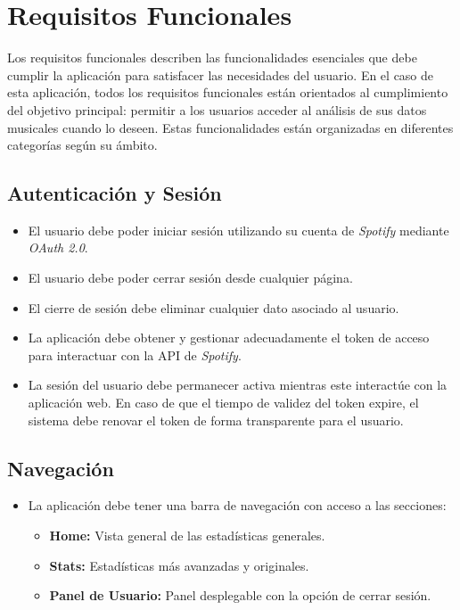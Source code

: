 \section{Requisitos Funcionales}

Los requisitos funcionales describen las funcionalidades esenciales que debe cumplir la aplicación para satisfacer las necesidades del usuario. En el caso de esta aplicación, todos los requisitos funcionales están orientados al cumplimiento del objetivo principal: permitir a los usuarios acceder al análisis de sus datos musicales cuando lo deseen. Estas funcionalidades están organizadas en diferentes categorías según su ámbito.

\subsection{Autenticación y Sesión}
\begin{itemize}
    \item El usuario debe poder iniciar sesión utilizando su cuenta de \textit{Spotify} mediante \textit{OAuth 2.0}.
    \item El usuario debe poder cerrar sesión desde cualquier página.
    \item El cierre de sesión debe eliminar cualquier dato asociado al usuario.
    \item La aplicación debe obtener y gestionar adecuadamente el token de acceso para interactuar con la API de \textit{Spotify}.
    \item La sesión del usuario debe permanecer activa mientras este interactúe con la aplicación web. En caso de que el tiempo de validez del token expire, el sistema debe renovar el token de forma transparente para el usuario.
\end{itemize}

\subsection{Navegación}
\begin{itemize}
    \item La aplicación debe tener una barra de navegación con acceso a las secciones:
          \begin{itemize}
              \item \textbf{Home:} Vista general de las estadísticas generales.
              \item \textbf{Stats:} Estadísticas más avanzadas y originales.
              \item \textbf{Panel de Usuario:} Panel desplegable con la opción de cerrar sesión. %
          \end{itemize}
\end{itemize}

